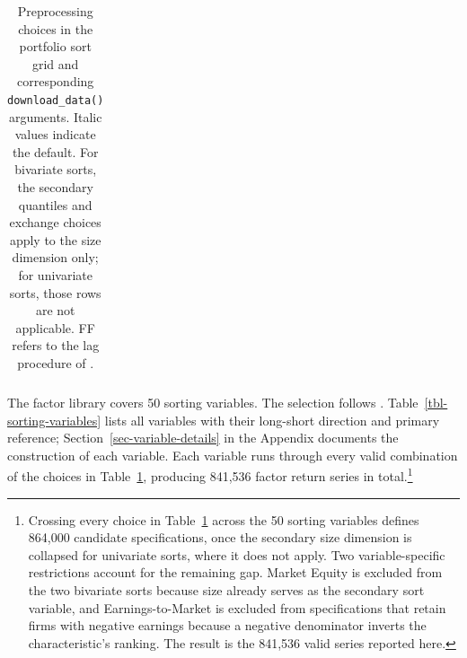 \documentclass[
  article]{jss}
\begin{document}
\begin{longtable}{>{\raggedright\arraybackslash}p{2.4cm}>{\raggedright\arraybackslash}p{3.2cm}>{\raggedright\arraybackslash}p{2.8cm}>{\raggedright\arraybackslash}p{4.8cm}}
\caption{\label{tbl-sorting-decisions}Preprocessing choices in the
portfolio sort grid and corresponding \texttt{download\_data()}
arguments. Italic values indicate the default. For bivariate sorts, the
secondary quantiles and exchange choices apply to the size dimension
only; for univariate sorts, those rows are not applicable. FF refers to
the lag procedure of \citet{fama.1993}.}

\tabularnewline
\end{longtable}

The factor library covers 50 sorting variables. The selection follows
\citet{jensen.2023}. Table~\ref{tbl-sorting-variables} lists all
variables with their long-short direction and primary reference;
Section~\ref{sec-variable-details} in the Appendix documents the
construction of each variable. Each variable runs through every valid
combination of the choices in Table~\ref{tbl-sorting-decisions},
producing 841,536 factor return series in total.\footnote{Crossing every
  choice in Table~\ref{tbl-sorting-decisions} across the 50 sorting
  variables defines 864,000 candidate specifications, once the secondary
  size dimension is collapsed for univariate sorts, where it does not
  apply. Two variable-specific restrictions account for the remaining
  gap. Market Equity is excluded from the two bivariate sorts because
  size already serves as the secondary sort variable, and
  Earnings-to-Market is excluded from specifications that retain firms
  with negative earnings because a negative denominator inverts the
  characteristic's ranking. The result is the 841,536 valid series
  reported here.}

\begingroup\small
\setlength{\tabcolsep}{4pt}
\renewcommand{\arraystretch}{1.0}

\begingroup\small
\setlength{\tabcolsep}{4pt}
\renewcommand{\arraystretch}{1.0}
\end{document}
